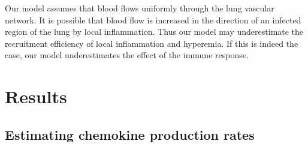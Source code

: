 \documentclass[10pt]{article}
\newcommand{\removed}[1]{{\color{dkred}\sout{#1}}}
\newcommand{\fred}[1]{{\color{dkblue}#1}}
\begin{document}
Our model assumes that blood flows uniformly through the lung vascular network.  It is possible that blood flow is increased in the direction of an infected region of the lung by local inflammation.  Thus our model may underestimate the recruitment efficiency of local inflammation and hyperemia.  If this is indeed the case, our model underestimates the effect of the immune response.

%



\section{Results}

\subsection{Estimating chemokine production rates}
\end{document}
